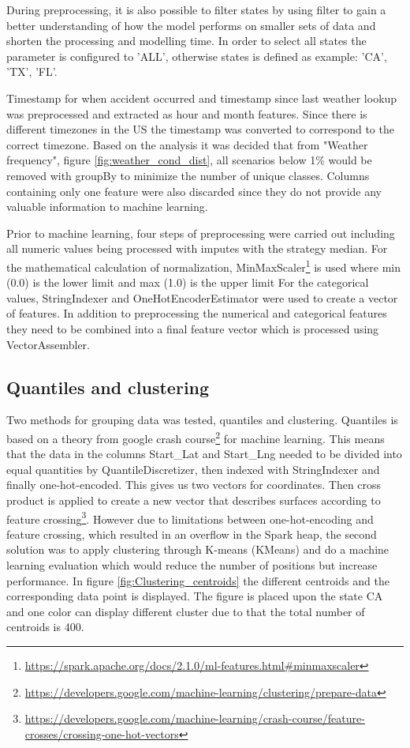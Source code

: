 \documentclass[../main.tex]{subfiles}
\begin{document}
During preprocessing, it is also possible to filter states by using filter to gain a better understanding of how the model performs on smaller sets of data and shorten the processing and modelling time. In order to select all states the parameter is configured to 'ALL', otherwise states is defined as example: 'CA', 'TX', 'FL'.


Timestamp for when accident occurred and timestamp since last weather lookup was preprocessed and extracted as hour and month features. Since there is different timezones in the US the timestamp was converted to correspond to the correct timezone. Based on the analysis it was decided that from "Weather frequency", figure \ref{fig:weather_cond_dist}, all scenarios below 1\% would be removed with groupBy to minimize the number of unique classes. Columns containing only one feature were also discarded since they do not provide any valuable information to machine learning.

Prior to machine learning, four steps of preprocessing were carried out including all numeric values being processed with imputes with the strategy median. For the mathematical calculation of normalization, MinMaxScaler\footnote{\url{https://spark.apache.org/docs/2.1.0/ml-features.html#minmaxscaler}} is used where min (0.0) is the lower limit and max (1.0) is the upper limit 
For the categorical values, StringIndexer and OneHotEncoderEstimator were used to create a vector of features. In addition to preprocessing the numerical and categorical features they need to be combined into a final feature vector which is processed using VectorAssembler. 

\subsection{Quantiles and clustering}
Two methods for grouping data was tested, quantiles and clustering. Quantiles is based on a theory from google crash course\footnote{\url{https://developers.google.com/machine-learning/clustering/prepare-data}} for machine learning. This means that the data in the columns Start\_Lat and Start\_Lng needed to be divided into equal quantities by QuantileDiscretizer, then indexed with StringIndexer and finally one-hot-encoded. This gives us two vectors for coordinates. Then cross product is applied to create a new vector that describes surfaces according to feature crossing\footnote{\url{https://developers.google.com/machine-learning/crash-course/feature-crosses/crossing-one-hot-vectors}}. However due to limitations between one-hot-encoding and feature crossing, which resulted in an overflow in the Spark heap, the second solution was to apply clustering through K-means (KMeans) and do a machine learning evaluation which would reduce the number of positions but increase performance. In figure \ref{fig:Clustering_centroids} the different centroids and the corresponding data point is displayed. The figure is placed upon the state CA and one color can display different cluster due to that the total number of centroids is 400. 
\end{document}
